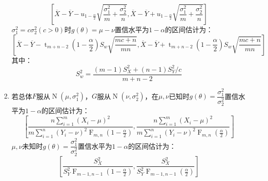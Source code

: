 \begin{theorem}
\begin{enumerate}
\begin{equation*}
			\left[\overline{X}-\overline{Y}-u_{1-\frac{\alpha}{2}}\sqrt{\dfrac{\sigma_1^2}{m}+\dfrac{\sigma_2^2}{n}},\overline{X}-\overline{Y}+u_{1-\frac{\alpha}{2}}\sqrt{\dfrac{\sigma_1^2}{m}+\dfrac{\sigma_2^2}{n}}\right]
		\end{equation*}
		$\sigma_1^2=c\sigma_2^2(c>0)$时$g(\theta)=\mu-\nu$置信水平为$1-\alpha$的区间估计为：
		\begin{equation*}
			\left[\overline{X}-\overline{Y}-\operatorname{t}_{m+n-2}\left(1-\frac{\alpha}{2}\right)S_w\sqrt{\dfrac{mc+n}{mn}},\overline{X}-\overline{Y}+\operatorname{t}_{m+n-2}\left(1-\frac{\alpha}{2}\right)S_w\sqrt{\dfrac{mc+n}{mn}}\right]
		\end{equation*}
		其中：
		\begin{equation*}
			S_w^2=\frac{(m-1)S_X^2+(n-1)S_Y^2/c}{m+n-2}
		\end{equation*}
		\item 若总体$F$服从$\operatorname{N}(\mu,\sigma_1^2)$，$G$服从$\operatorname{N}(\nu,\sigma_2^2)$，在$\mu,\nu$已知时$g(\theta)=\dfrac{\sigma_1^2}{\sigma_2^2}$置信水平为$1-\alpha$的区间估计为：
		\begin{equation*}
			\left[\frac{n\sum\limits_{i=1}^{m}(X_i-\mu)^2}{m\sum\limits_{i=1}^{n}(Y_i-\nu)^2\operatorname{F}_{m,n}\left(1-\frac{\alpha}{2}\right)},\frac{n\sum\limits_{i=1}^{m}(X_i-\mu)^2}{m\sum\limits_{i=1}^{n}(Y_i-\nu)^2\operatorname{F}_{m,n}\left(\frac{\alpha}{2}\right)}\right]
		\end{equation*}
		$\mu,\nu$未知时$g(\theta)=\dfrac{\sigma_1^2}{\sigma_2^2}$置信水平为$1-\alpha$的区间估计为：
		\begin{equation*}
			\left[\frac{S_X^2}{S_Y^2\operatorname{F}_{m-1,n-1}\left(1-\frac{\alpha}{2}\right)},\frac{S_X^2}{S_Y^2\operatorname{F}_{m-1,n-1}\left(\frac{\alpha}{2}\right)}\right]
		\end{equation*}
	\end{enumerate}
\end{theorem}
